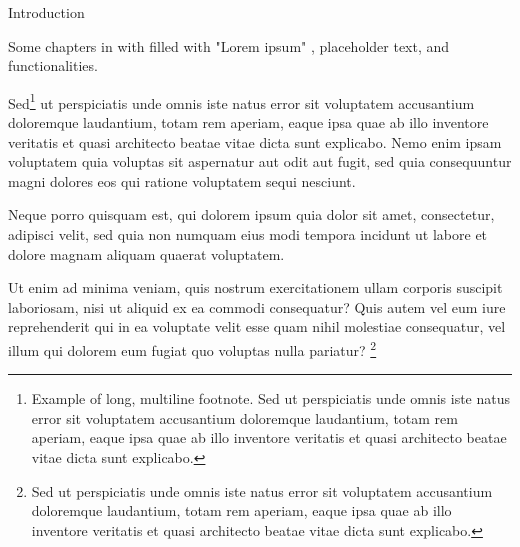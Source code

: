 \documentclass[french, english]{mythesis}
\begin{document}
	\begin{mychapter+}{Introduction}
	
 	Some  chapters in  with  filled with "Lorem ipsum" ,  placeholder text, and  functionalities.
 	
	Sed\footnote{Example of long, multiline footnote. Sed ut perspiciatis unde omnis iste natus error sit voluptatem accusantium doloremque laudantium, totam rem aperiam, eaque ipsa quae ab illo inventore veritatis et quasi architecto beatae vitae dicta sunt explicabo.} ut perspiciatis unde omnis iste natus error sit voluptatem accusantium doloremque laudantium, totam rem aperiam, eaque ipsa quae ab illo inventore veritatis et quasi architecto beatae vitae dicta sunt explicabo. Nemo enim ipsam voluptatem quia voluptas sit aspernatur aut odit aut fugit, sed quia consequuntur magni dolores eos qui ratione voluptatem sequi nesciunt. 

\begin{displayquote}
Neque porro quisquam est, qui dolorem ipsum quia dolor sit amet, consectetur, adipisci velit, sed quia non numquam eius modi tempora incidunt ut labore et dolore magnam aliquam quaerat voluptatem.
\end{displayquote} 
	
	Ut enim ad minima veniam, quis nostrum exercitationem ullam corporis suscipit laboriosam, nisi ut aliquid ex ea commodi consequatur? Quis autem vel eum iure reprehenderit qui in ea voluptate velit esse quam nihil molestiae consequatur, vel illum qui dolorem eum fugiat quo voluptas nulla pariatur? \footnote{Sed ut perspiciatis unde omnis iste natus error sit voluptatem accusantium doloremque laudantium, totam rem aperiam, eaque ipsa quae ab illo inventore veritatis et quasi architecto beatae vitae dicta sunt explicabo.}
		

\end{mychapter+}
\end{document}
